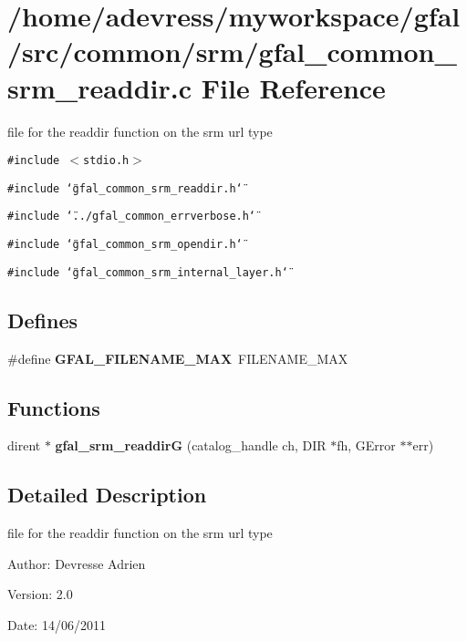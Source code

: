 \section{/home/adevress/myworkspace/gfal/src/common/srm/gfal\_\-common\_\-srm\_\-readdir.c File Reference}
\label{gfal__common__srm__readdir_8c}
file for the readdir function on the srm url type 

{\tt \#include $<$stdio.h$>$}\par
{\tt \#include \char`\"{}gfal\_\-common\_\-srm\_\-readdir.h\char`\"{}}\par
{\tt \#include \char`\"{}../gfal\_\-common\_\-errverbose.h\char`\"{}}\par
{\tt \#include \char`\"{}gfal\_\-common\_\-srm\_\-opendir.h\char`\"{}}\par
{\tt \#include \char`\"{}gfal\_\-common\_\-srm\_\-internal\_\-layer.h\char`\"{}}\par
\subsection*{Defines}
\begin{CompactItemize}
\item 
\#define \textbf{GFAL\_\-FILENAME\_\-MAX}~FILENAME\_\-MAX\label{gfal__common__srm__readdir_8c_595a5b00305895e25ce0e00b177fd8a8}

\end{CompactItemize}
\subsection*{Functions}
\begin{CompactItemize}
\item 
dirent $\ast$ \textbf{gfal\_\-srm\_\-readdir\-G} (catalog\_\-handle ch, DIR $\ast$fh, GError $\ast$$\ast$err)\label{gfal__common__srm__readdir_8c_58f50a470d3a75e315669317c727dbb9}

\end{CompactItemize}


\subsection{Detailed Description}
file for the readdir function on the srm url type 

\begin{Desc}
\item[Author:]Devresse Adrien \end{Desc}
\begin{Desc}
\item[Version:]2.0 \end{Desc}
\begin{Desc}
\item[Date:]14/06/2011 \end{Desc}
